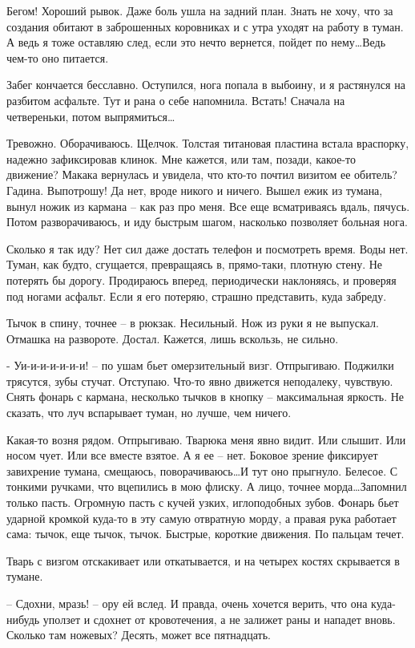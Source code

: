 \documentclass[a4paper]{book}
\begin{document}
Бегом! Хороший рывок. Даже боль ушла на задний план. Знать не хочу, что за создания обитают в заброшенных коровниках и с утра уходят на работу в туман. А ведь я тоже оставляю след, если это нечто вернется, пойдет по нему\ldots Ведь чем-то оно питается. 

Забег кончается бесславно. Оступился, нога попала в выбоину, и я растянулся на разбитом асфальте. Тут и рана о себе напомнила. Встать! Сначала на четвереньки, потом выпрямиться\ldots 

Тревожно. Оборачиваюсь. Щелчок. Толстая титановая пластина встала враспорку, надежно зафиксировав клинок. Мне кажется, или там, позади, какое-то движение? Макака вернулась и увидела, что кто-то почтил визитом ее обитель? Гадина. Выпотрошу! Да нет, вроде никого и ничего. Вышел ежик из тумана, вынул ножик из кармана -- как раз про меня. Все еще всматриваясь вдаль, пячусь. Потом разворачиваюсь, и иду быстрым шагом, насколько позволяет больная нога.

Сколько я так иду? Нет сил даже достать телефон и посмотреть время. Воды нет. Туман, как будто, сгущается, превращаясь в, прямо-таки, плотную стену. Не потерять бы дорогу. Продираюсь вперед, периодически наклоняясь, и проверяя под ногами асфальт. Если я его потеряю, страшно представить, куда забреду. 

Тычок в спину, точнее --  в рюкзак. Несильный. Нож из руки я не выпускал. Отмашка на развороте. Достал. Кажется, лишь вскользь, не сильно.

- Уи-и-и-и-и-и-и! -- по ушам бьет омерзительный визг. Отпрыгиваю. Поджилки трясутся, зубы стучат. Отступаю. Что-то явно движется неподалеку, чувствую. Снять фонарь с кармана, несколько тычков в кнопку -- максимальная яркость. Не сказать, что луч вспарывает туман, но лучше, чем ничего.

Какая-то возня рядом. Отпрыгиваю. Тварюка меня явно видит. Или слышит. Или носом чует. Или все вместе взятое. А я ее -- нет. Боковое зрение фиксирует завихрение тумана, смещаюсь, поворачиваюсь\ldots И тут оно прыгнуло. Белесое. С тонкими ручками, что вцепились в мою флиску. А лицо, точнее морда\ldots Запомнил только пасть. Огромную пасть с кучей узких, иглоподобных зубов. Фонарь бьет ударной кромкой куда-то в эту самую отвратную морду, а правая рука работает сама: тычок, еще тычок, тычок. Быстрые, короткие движения. По пальцам течет.

Тварь с визгом отскакивает или откатывается, и на четырех костях скрывается в тумане. 

-- Сдохни, мразь! -- ору ей вслед. И правда, очень хочется верить, что она куда-нибудь уползет и сдохнет от кровотечения, а не залижет раны и нападет вновь. Сколько там ножевых? Десять, может все пятнадцать.
\end{document}
